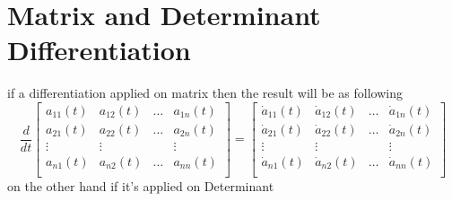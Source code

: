 \documentclass[]{article}
\begin{document}
\section{Matrix and Determinant Differentiation}
if a differentiation applied on matrix then the result will be as following
\[
    \frac{d}{dt} \begin{bmatrix}
        a_{11}(t) & a_{12}(t) & \dots & a_{1n}(t)\\
        a_{21}(t) & a_{22}(t) & \dots & a_{2n}(t)\\
        \vdots &\vdots & &\vdots \\
        a_{n1}(t) & a_{n2}(t) & \dots & a_{nn}(t)\\
    \end{bmatrix} 
    =
    \begin{bmatrix}
        \dot{a}_{11}(t) & \dot{a}_{12}(t) & \dots & \dot{a}_{1n}(t)\\
        \dot{a}_{21}(t) & \dot{a}_{22}(t) & \dots & \dot{a}_{2n}(t)\\
        \vdots &\vdots & &\vdots \\
        \dot{a}_{n1}(t) & \dot{a}_{n2}(t) & \dots & \dot{a}_{nn}(t)\\
    \end{bmatrix}  
\]
on the other hand if it's applied on Determinant
\end{document}
